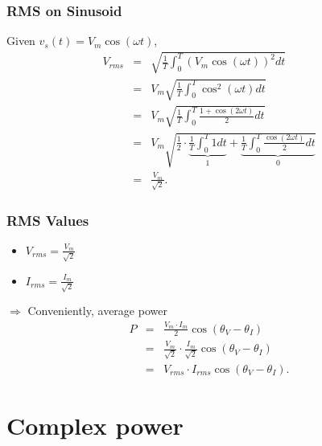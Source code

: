 \documentclass{beamer}
\begin{document}

\begin{frame}[fragile]
\frametitle{RMS on Sinusoid}

\vspace{-0.2cm}

Given $v_s(t) = V_m \cos(\omega t)$,
%
\vspace{-0.2cm}
%
\begin{eqnarray}
V_{rms} &=& \sqrt{\frac{1}{T} \int_0^T \left( V_m \cos(\omega t)\right)^2 dt}
\nonumber \\
&=& V_m \sqrt{\frac{1}{T} \int_0^T \cos^2(\omega t) dt}
\nonumber \\
&=& V_m \sqrt{\frac{1}{T} \int_0^T \frac{1 + \cos(2 \omega t)}{2} dt}
\nonumber \\
&=& V_m \sqrt{\frac{1}{2} \cdot \underbrace{\frac{1}{T} \int_0^T 1 dt}_1 + \underbrace{\frac{1}{T}\int_0^T  \frac{\cos(2 \omega t)}{2} dt}_0 }
\nonumber \\
&=& \frac{V_m}{\sqrt{2}}
\label{eq: Vrms}.
\end{eqnarray}

\end{frame}


\begin{frame}[fragile]
\frametitle{RMS Values}

\begin{itemize}
\item $V_{rms} = \frac{V_m}{\sqrt{2}}$
\item $I_{rms} = \frac{I_m}{\sqrt{2}}$
\end{itemize}

\vspace{1cm}

$\Rightarrow$ Conveniently, average power
\begin{eqnarray}
P &=& \frac{V_m \cdot I_m}{2} \cos(\theta_V - \theta_I)
\nonumber \\
&=& \frac{V_m}{\sqrt{2}} \cdot \frac{I_m}{\sqrt{2}} \cos(\theta_V - \theta_I)
\nonumber \\
&=& V_{rms}  \cdot I_{rms} \cos(\theta_V - \theta_I)
\nonumber .
\end{eqnarray}


\end{frame}


\section{Complex power}
\end{document}
